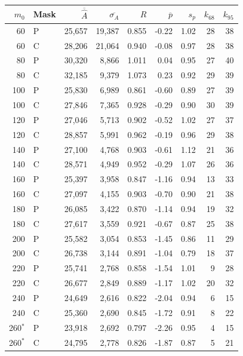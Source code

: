 \begin{tabular}{rlrrrrrrr}
\toprule
$m_0$ & Mask & $\overline{\widehat A}$ & $\overline{\sigma_A}$ & $R$ & $\overline p$ & $s_p$ & $k_{68}$ & $k_{95}$ \\
\midrule
60 & P & 25,657 & 19,387 & 0.855 & -0.22 & 1.02 & 28 & 38 \\
60 & C & 28,206 & 21,064 & 0.940 & -0.08 & 0.97 & 28 & 38 \\
80 & P & 30,320 & 8,866 & 1.011 & 0.04 & 0.95 & 27 & 40 \\
80 & C & 32,185 & 9,379 & 1.073 & 0.23 & 0.92 & 29 & 39 \\
100 & P & 25,830 & 6,989 & 0.861 & -0.60 & 0.89 & 27 & 39 \\
100 & C & 27,846 & 7,365 & 0.928 & -0.29 & 0.90 & 30 & 39 \\
120 & P & 27,046 & 5,713 & 0.902 & -0.52 & 1.02 & 27 & 37 \\
120 & C & 28,857 & 5,991 & 0.962 & -0.19 & 0.96 & 29 & 38 \\
140 & P & 27,100 & 4,768 & 0.903 & -0.61 & 1.12 & 21 & 36 \\
140 & C & 28,571 & 4,949 & 0.952 & -0.29 & 1.07 & 26 & 36 \\
160 & P & 25,397 & 3,958 & 0.847 & -1.16 & 0.94 & 13 & 33 \\
160 & C & 27,097 & 4,155 & 0.903 & -0.70 & 0.90 & 21 & 38 \\
180 & P & 26,085 & 3,422 & 0.870 & -1.14 & 0.94 & 19 & 32 \\
180 & C & 27,617 & 3,559 & 0.921 & -0.67 & 0.87 & 25 & 38 \\
200 & P & 25,582 & 3,054 & 0.853 & -1.45 & 0.86 & 11 & 29 \\
200 & C & 26,738 & 3,144 & 0.891 & -1.04 & 0.79 & 18 & 37 \\
220 & P & 25,741 & 2,768 & 0.858 & -1.54 & 1.01 & 9 & 28 \\
220 & C & 26,677 & 2,849 & 0.889 & -1.17 & 1.02 & 20 & 32 \\
240 & P & 24,649 & 2,616 & 0.822 & -2.04 & 0.94 & 6 & 15 \\
240 & C & 25,360 & 2,690 & 0.845 & -1.72 & 0.91 & 8 & 22 \\
260$^{*}$ & P & 23,918 & 2,692 & 0.797 & -2.26 & 0.95 & 4 & 15 \\
260$^{*}$ & C & 24,795 & 2,778 & 0.826 & -1.87 & 0.87 & 5 & 21 \\
\bottomrule
\end{tabular}
